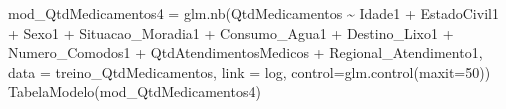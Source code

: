 \documentclass[
]{article}
\newenvironment{Shaded}{\begin{snugshade}}{\end{snugshade}}
\newcommand{\AttributeTok}[1]{\textcolor[rgb]{0.77,0.63,0.00}{#1}}
\newcommand{\DecValTok}[1]{\textcolor[rgb]{0.00,0.00,0.81}{#1}}
\newcommand{\FunctionTok}[1]{\textcolor[rgb]{0.00,0.00,0.00}{#1}}
\newcommand{\NormalTok}[1]{#1}
\newcommand{\OtherTok}[1]{\textcolor[rgb]{0.56,0.35,0.01}{#1}}
\newcommand{\SpecialCharTok}[1]{\textcolor[rgb]{0.00,0.00,0.00}{#1}}
\newcommand{\StringTok}[1]{\textcolor[rgb]{0.31,0.60,0.02}{#1}}
\begin{document}
\begin{Shaded}
\begin{Highlighting}[]
\NormalTok{mod\_QtdMedicamentos4 }\OtherTok{=} \FunctionTok{glm.nb}\NormalTok{(QtdMedicamentos }\SpecialCharTok{\textasciitilde{}}\NormalTok{ Idade1 }\SpecialCharTok{+}\NormalTok{ EstadoCivil1 }\SpecialCharTok{+}\NormalTok{ Sexo1 }\SpecialCharTok{+}\NormalTok{ Situacao\_Moradia1 }\SpecialCharTok{+} 
\NormalTok{                                Consumo\_Agua1 }\SpecialCharTok{+}\NormalTok{ Destino\_Lixo1 }\SpecialCharTok{+}\NormalTok{ Numero\_Comodos1 }\SpecialCharTok{+}\NormalTok{ QtdAtendimentosMedicos }\SpecialCharTok{+}
\NormalTok{                                Regional\_Atendimento1, }\AttributeTok{data =}\NormalTok{ treino\_QtdMedicamentos, }\AttributeTok{link =} \StringTok{\textquotesingle{}log\textquotesingle{}}\NormalTok{, }\AttributeTok{control=}\FunctionTok{glm.control}\NormalTok{(}\AttributeTok{maxit=}\DecValTok{50}\NormalTok{))}
\FunctionTok{TabelaModelo}\NormalTok{(mod\_QtdMedicamentos4)}
\end{Highlighting}
\end{Shaded}
\end{document}
